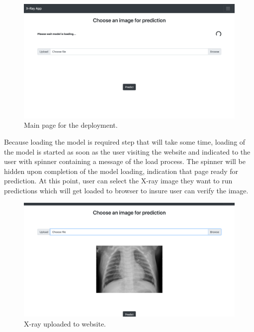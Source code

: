 \begin{figure}[H]
    \centering
    \includegraphics[width=\textwidth]{img/webhome.png}
    \caption{Main page for the deployment.}
    \label{fig:webhome}
\end{figure}

Because loading the model is required step that will take some time, loading of the model is started as soon as the user visiting the website and indicated to the user with spinner containing a message of the load process.
The spinner will be hidden upon completion of the model loading, indication that page ready for prediction.
At this point, user can select the X-ray image they want to run predictions which will get loaded to browser to insure user can verify the image.

\begin{figure}[H]
    \centering
    \includegraphics[width=\textwidth]{img/imageloaded.png}
    \caption{X-ray uploaded to website.}
    \label{fig:appimgload}
\end{figure}

